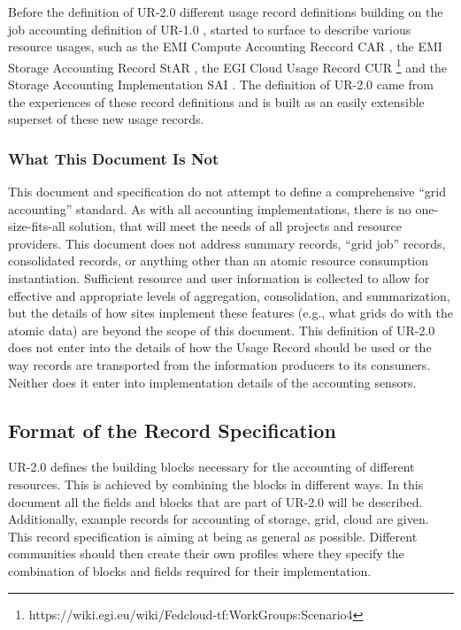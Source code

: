 Before the definition of UR-2.0 different usage record definitions building on the job accounting definition of UR-1.0 \cite{mach2007usagerecord}, started to surface to describe various resource usages, such as the EMI Compute Accounting Reccord CAR \cite{guarise2011definition}, the EMI Storage Accounting Record StAR \cite{nilsen2011emi}, the EGI Cloud Usage Record CUR \footnote{https://wiki.egi.eu/wiki/Fedcloud-tf:WorkGroups:Scenario4} and the Storage Accounting Implementation SAI \cite{cristofori2011grid}. The definition of UR-2.0 came from the experiences of these record definitions and is built as an easily extensible superset of these new usage records.






\subsubsection{What This Document Is Not}

This document and specification do not attempt to define a comprehensive ``grid accounting'' standard. As with all accounting implementations, there is no one-size-fits-all solution, that will meet the needs of all projects and resource providers. This document does not address summary records, ``grid job'' records, consolidated records, or anything other than an atomic resource consumption instantiation. Sufficient resource and user information is collected to allow for effective and appropriate levels of aggregation, consolidation, and summarization, but the details of how sites implement these features (e.g., what grids do with the atomic data) are beyond the scope of this document. This definition of UR-2.0 does not enter into the details of how the Usage Record should be used or the way records are transported from the information producers to its consumers. Neither does it enter into implementation details of the accounting sensors.






\subsection{Format of the Record Specification}

UR-2.0 defines the building blocks necessary for the accounting of different resources. This is achieved by combining the blocks in different ways. In this document all the fields and blocks that are part of UR-2.0 will be described. Additionally, example records for accounting of storage, grid, cloud are given. This record specification is aiming at being as general as possible. Different communities should then create their own profiles where they specify the combination of blocks and fields required for their implementation. 



